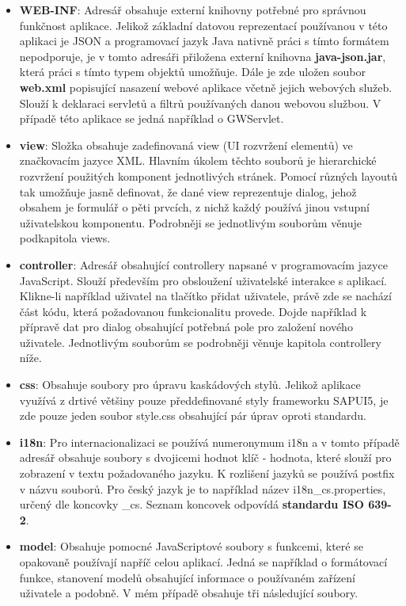 \documentclass[thesis=M,czech]{FITthesis}[2012/06/26]
\begin{document}
\begin{itemize}
	\item
	\textbf{WEB-INF}: \label{item:pm_web_inf} Adresář obsahuje externí knihovny potřebné pro správnou funkčnost aplikace. Jelikož základní datovou reprezentací používanou v této aplikaci je JSON a programovací jazyk Java nativně práci s tímto formátem nepodporuje, je v tomto adresáři přiložena externí knihovna \textbf{java-json.jar}, která práci s tímto typem objektů umožňuje. Dále je zde uložen soubor \textbf{web.xml} popisující nasazení webové aplikace včetně jejich webových služeb. Slouží k deklaraci servletů a filtrů používaných danou webovou službou. V případě této aplikace se jedná například o GWServlet.
	\item
	\textbf{view}: Složka obsahuje zadefinovaná view (UI rozvržení elementů) ve značkovacím jazyce XML. Hlavním úkolem těchto souborů je hierarchické rozvržení použitých komponent jednotlivých stránek. Pomocí různých layoutů tak umožňuje jasně definovat, že dané view reprezentuje dialog, jehož obsahem je formulář o pěti prvcích, z nichž každý používá jinou vstupní uživatelskou komponentu. Podrobněji se jednotlivým souborům věnuje podkapitola views. 
	\item
	\textbf{controller}: Adresář obsahující controllery napsané v programovacím jazyce JavaScript. Slouží především pro obsloužení uživatelské interakce s aplikací. Klikne-li například uživatel na tlačítko přidat uživatele, právě zde se nachází část kódu, která požadovanou funkcionalitu provede. Dojde například k přípravě dat pro dialog obsahující potřebná pole pro založení nového uživatele. Jednotlivým souborům se podrobněji věnuje kapitola controllery níže.
	\item
	\textbf{css}: Obsahuje soubory pro úpravu kaskádových stylů. Jelikož aplikace využívá z drtivé většiny pouze předdefinované styly frameworku SAPUI5, je zde pouze jeden soubor style.css obsahující pár úprav oproti standardu.
	\item
	\textbf{i18n}: Pro internacionalizaci se používá numeronymum i18n a v tomto případě adresář obsahuje soubory s dvojicemi hodnot klíč - hodnota, které slouží pro zobrazení v textu požadovaného jazyku. K rozlišení jazyků se používá postfix v názvu souborů. Pro český jazyk je to například název i18n\_cs.properties, určený dle koncovky \_cs. Seznam koncovek odpovídá \textbf{standardu ISO 639-2}.	
	\item
	\textbf{model}: Obsahuje pomocné JavaScriptové soubory s funkcemi, které se opakovaně používají napříč celou aplikací. Jedná se například o formátovací funkce, stanovení modelů obsahující informace o používaném zařízení uživatele a podobně. V mém případě obsahuje tři následující soubory.

\end{itemize}
\end{document}
